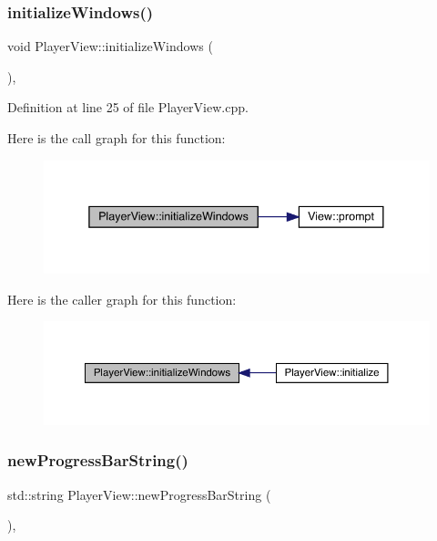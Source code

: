 \subsubsection{\texorpdfstring{initialize\+Windows()}{initializeWindows()}}
{\footnotesize\ttfamily void Player\+View\+::initialize\+Windows (\begin{DoxyParamCaption}{ }\end{DoxyParamCaption})\hspace{0.3cm}{\ttfamily [inline]}, {\ttfamily [private]}}



Definition at line 25 of file Player\+View.\+cpp.

Here is the call graph for this function\+:
\nopagebreak
\begin{figure}[H]
\begin{center}
\leavevmode
\includegraphics[width=338pt]{class_player_view_ae054992ef7cb944201aa643ca73327aa_cgraph}
\end{center}
\end{figure}
Here is the caller graph for this function\+:
\nopagebreak
\begin{figure}[H]
\begin{center}
\leavevmode
\includegraphics[width=350pt]{class_player_view_ae054992ef7cb944201aa643ca73327aa_icgraph}
\end{center}
\end{figure}
\mbox{\label{class_player_view_aae1b5c77e61dfeebaa124b379206cfbc}} 
\subsubsection{\texorpdfstring{new\+Progress\+Bar\+String()}{newProgressBarString()}}
{\footnotesize\ttfamily std\+::string Player\+View\+::new\+Progress\+Bar\+String (\begin{DoxyParamCaption}{ }\end{DoxyParamCaption})\hspace{0.3cm}{\ttfamily [inline]}, {\ttfamily [private]}}



